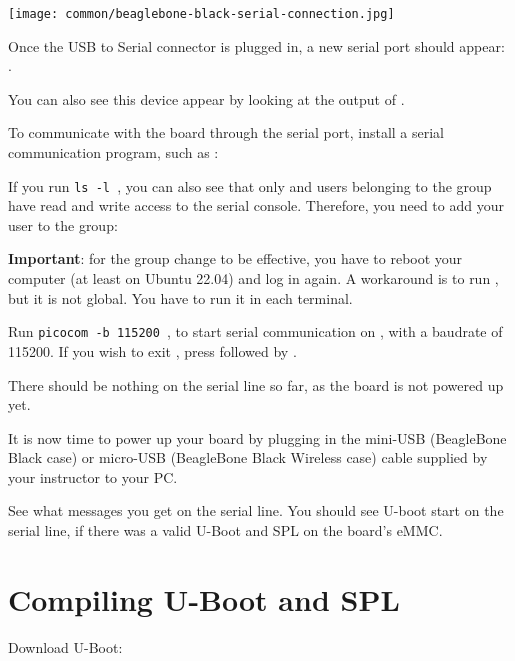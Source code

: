 \begin{center}
\texttt{[image: common/beaglebone-black-serial-connection.jpg]}
\end{center}

Once the USB to Serial connector is plugged in, a new serial port
should appear: .

You can also see this device appear by looking at the output of
.

To communicate with the board through the serial port, install a
serial communication program, such as :


If you run {\tt ls -l \hosttty}, you can also see that only
 and users belonging to the  group have
read and write access to the serial console. Therefore, you need
to add your user to the  group:


{\bf Important}: for the group change to be effective, you have to
reboot your computer (at least on Ubuntu 22.04) and log in again.
A workaround is to run , but it is not global.
You have to run it in each terminal.

Run {\tt picocom -b 115200 \hosttty}, to start serial
communication on {\tt \hosttty}, with a baudrate of 115200.
If you wish to exit , press \code{[Ctrl][a]} followed by
\code{[Ctrl][x]}.

There should be nothing on the serial line so far, as the board is not
powered up yet.

It is now time to power up your board by plugging in the mini-USB
(BeagleBone Black case) or micro-USB (BeagleBone Black Wireless case)
cable supplied by your instructor to your PC.

See what messages you get on the serial line. You should see U-boot
start on the serial line, if there was a valid U-Boot and SPL on the board's eMMC.

\section{Compiling U-Boot and SPL}

Download U-Boot:


